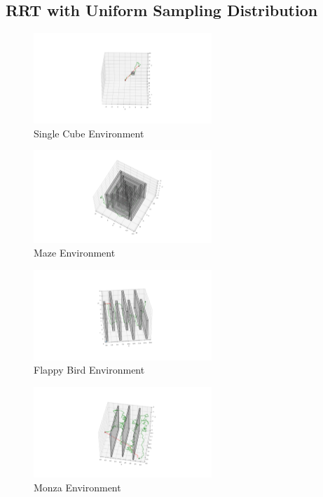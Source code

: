 \documentclass[conference]{IEEEtran}
\begin{document}
\subsection{RRT with Uniform Sampling Distribution}
\begin{figure}[H]
    \centering
    \includegraphics[width=0.6\textwidth]{cube_rrt.png}
    \caption{Single Cube Environment}
    \label{fig:cube_rrt}
\end{figure}
\begin{figure}[H]
    \centering
    \includegraphics[width=0.6\textwidth]{maze_rrt.png}
    \caption{Maze Environment}
    \label{fig:maze_rrt}
\end{figure}
\begin{figure}[H]
    \centering
    \includegraphics[width=0.6\textwidth]{flappy_bird_rrt.png}
    \caption{Flappy Bird Environment}
    \label{fig:flappy_bird_rrt}
\end{figure}
\begin{figure}[H]
    \centering
    \includegraphics[width=0.6\textwidth]{monza_rrt.png}
    \caption{Monza Environment}
    \label{fig:monza_rrt}
\end{figure}
\end{document}
